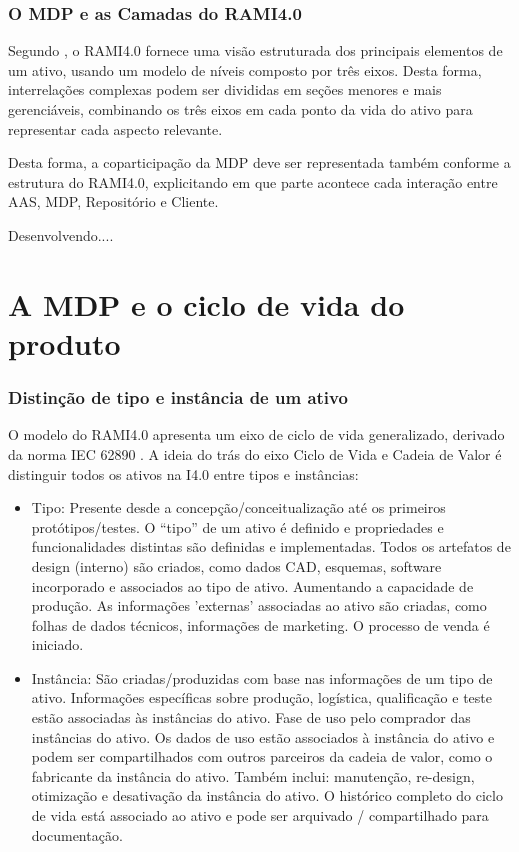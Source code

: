 \documentclass[
	12pt,				%
	oneside,			%
	a4paper,			%
	english,			%
	brazil				%
]{abntex2}
\begin{document}
	\subsection{O MDP e as Camadas do RAMI4.0}

	Segundo , o RAMI4.0 fornece uma visão estruturada dos principais elementos de um ativo, usando um modelo de níveis composto por três eixos. Desta forma, interrelações complexas podem ser divididas em seções menores e mais gerenciáveis, combinando os três eixos em cada ponto da vida do ativo para representar cada aspecto relevante.
	
	Desta forma, a coparticipação da MDP deve ser representada também conforme a estrutura do RAMI4.0, explicitando em que parte acontece cada interação entre AAS, MDP, Repositório e Cliente.
	
	
	Desenvolvendo....
	
	
	
\chapter{A MDP e o ciclo de vida do produto}

	\subsection{Distinção de tipo e instância de um ativo}
	
	O modelo do RAMI4.0 apresenta um eixo de ciclo de vida generalizado, derivado da norma IEC 62890 \cite{adolphs2015rami}. A ideia do trás do eixo Ciclo de Vida e Cadeia de Valor é distinguir todos os ativos na I4.0 entre tipos e instâncias:
	
	\begin{itemize}
		\item Tipo: Presente desde a concepção/conceitualização até os primeiros protótipos/testes. O ``tipo'' de um ativo é definido e propriedades e funcionalidades distintas são definidas e implementadas. Todos os artefatos de design (interno) são criados, como dados CAD, esquemas, software incorporado e associados ao tipo de ativo. Aumentando a capacidade de produção. As informações 'externas' associadas ao ativo são criadas, como folhas de dados técnicos, informações de marketing. O processo de venda é iniciado.
		
		\item Instância: São criadas/produzidas com base nas informações de um tipo de ativo. Informações específicas sobre produção, logística, qualificação e teste estão associadas às instâncias do ativo. Fase de uso pelo comprador das instâncias do ativo. Os dados de uso estão associados à instância do ativo e podem ser compartilhados com outros parceiros da cadeia de valor, como o fabricante da instância do ativo.
		Também inclui: manutenção, re-design, otimização e desativação da instância do ativo. O histórico completo do ciclo de vida está associado ao ativo e pode ser arquivado / compartilhado para documentação.
		
	\end{itemize}
	
\end{document}
